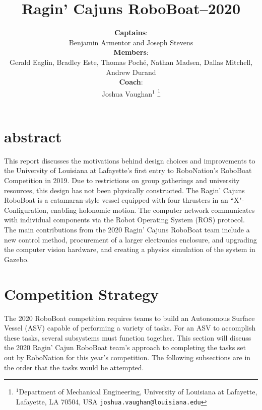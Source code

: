 \documentclass[letterpaper, 10 pt, conference]{ieeeconf}
\title{\LARGE \bf Ragin' Cajuns RoboBoat--2020}
\author{\textbf{Captains}:\\Benjamin Armentor and Joseph Stevens\\
\textbf{Members}:\\Gerald Eaglin, Bradley Este, Thomas Poché, Nathan Madsen, Dallas Mitchell, Andrew Durand\\
\textbf{Coach}:\\Joshua Vaughan$^{1}$%
\thanks{$^{1}$Department of Mechanical Engineering,
        University of Louisiana at Lafayette, Lafayette, LA 70504, USA
        {\tt\small joshua.vaughan@louisiana.edu}}%
}
\begin{document}
\maketitle
\thispagestyle{empty}
\section{abstract}
This report discusses the motivations behind design choices and improvements to the University of Louisiana at Lafayette's first entry to RoboNation's RoboBoat Competition in 2019. Due to restrictions on group gatherings and university resources, this design has not been physically constructed.  The Ragin' Cajuns RoboBoat is a catamaran-style vessel equipped with four thrusters in an ``X"-Configuration, enabling holonomic motion. The computer network communicates with individual components via the Robot Operating System (ROS) protocol. The main contributions from the 2020 Ragin' Cajuns RoboBoat team include a new control method, procurement of a larger electronics enclosure, and upgrading the computer vision hardware, and creating a physics simulation of the system in Gazebo.

\section{Competition Strategy}
The 2020 RoboBoat competition requires teams to build an Autonomous Surface Vessel (ASV) capable of performing a variety of tasks. For an ASV to accomplish these tasks, several subsystems must function together. This section will discuss the 2020 Ragin' Cajun RoboBoat team's approach to completing the tasks set out by RoboNation for this year's competition. The following subsections are in the order that the tasks would be attempted.
\end{document}
